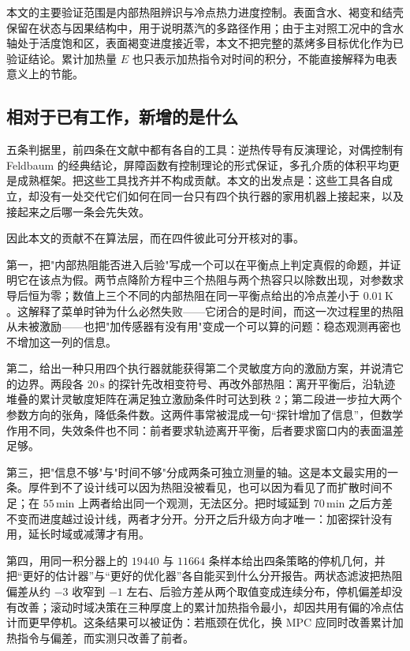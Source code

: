 本文的主要验证范围是内部热阻辨识与冷点热力进度控制。表面含水、褐变和结壳保留在状态与因果结构中，用于说明蒸汽的多路径作用；由于主对照工况中的含水轴处于活度饱和区，表面褐变进度接近零，本文不把完整的蒸烤多目标优化作为已验证结论。累计加热量 \(E\) 也只表示加热指令对时间的积分，不能直接解释为电表意义上的节能。

\subsection{相对于已有工作，新增的是什么}

五条判据里，前四条在文献中都有各自的工具：逆热传导有反演理论，对偶控制有 Feldbaum 的经典结论，屏障函数有控制理论的形式保证，多孔介质的体积平均更是成熟框架。把这些工具找齐并不构成贡献。本文的出发点是：这些工具各自成立，却没有一处交代它们如何在同一台只有四个执行器的家用机器上接起来，以及接起来之后哪一条会先失效。

因此本文的贡献不在算法层，而在四件彼此可分开核对的事。

第一，把"内部热阻能否进入后验"写成一个可以在平衡点上判定真假的命题，并证明它在该点为假。两节点降阶方程中三个热阻与两个热容只以除数出现，对参数求导后恒为零；数值上三个不同的内部热阻在同一平衡点给出的冷点差小于 \(0.01\,\mathrm{K}\)。这解释了菜单时钟为什么必然失败——它闭合的是时间，而这一次过程里的热阻从未被激励——也把"加传感器有没有用"变成一个可以算的问题：稳态观测再密也不增加这一列的信息。

第二，给出一种只用四个执行器就能获得第二个灵敏度方向的激励方案，并说清它的边界。两段各 \(20\,\mathrm{s}\) 的探针先改相变符号、再改外部热阻：离开平衡后，沿轨迹堆叠的累计灵敏度矩阵在满足独立激励条件时可达到秩 \(2\)；第二段进一步拉大两个参数方向的张角，降低条件数。这两件事常被混成一句“探针增加了信息”，但数学作用不同，失效条件也不同：前者要求轨迹离开平衡，后者要求窗口内的表面温差足够。

第三，把"信息不够"与"时间不够"分成两条可独立测量的轴。这是本文最实用的一条。厚件到不了设计线可以因为热阻没被看见，也可以因为看见了而扩散时间不足；在 \(55\,\mathrm{min}\) 上两者给出同一个观测，无法区分。把时域延到 \(70\,\mathrm{min}\) 之后方差不变而进度越过设计线，两者才分开。分开之后升级方向才唯一：加密探针没有用，延长时域或减薄才有用。

第四，用同一积分器上的 \(19440\) 与 \(11664\) 条样本给出四条策略的停机几何，并把“更好的估计器”与“更好的优化器”各自能买到什么分开报告。两状态滤波把热阻偏差从约 \(-3\) 收窄到 \(-1\) 左右、后验方差从两个取值变成连续分布，停机偏差却没有改善；滚动时域决策在三种厚度上的累计加热指令最小，却因共用有偏的冷点估计而更早停机。这条结果可以被证伪：若瓶颈在优化，换 MPC 应同时改善累计加热指令与偏差，而实测只改善了前者。

